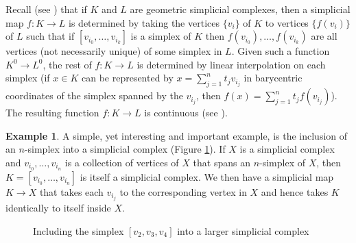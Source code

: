 \documentclass[12pt]{article}
\theoremstyle{plain}
\theoremstyle{definition}
\newtheorem{example}[theorem]{Example}
\begin{document}
Recall (see \cite[Section 2]{MK}) that if $K$ and $L$ are geometric simplicial complexes, then a simplicial map $f\colon K\to L$ is determined by taking the vertices $\{v_i\}$ of $K$ to vertices $\{f(v_i)\}$ of $L$ such that if $[v_{i_0},\ldots, v_{i_k}]$ is a simplex of $K$ then $f(v_{i_0}),\ldots, f(v_{i_k})$ are all vertices (not necessarily unique) of some simplex in $L$. Given such a function $K^0\to L^0$, the rest of $f\colon K\to L$ is determined by linear interpolation on each simplex (if $x\in K$ can be represented by $x=\sum_{j=1}^n t_jv_{i_j}$ in barycentric coordinates of the simplex spanned by the $v_{i_j}$, then $f(x)=\sum_{j=1}^n t_jf(v_{i_j})$).  The resulting function $f\colon K\to L$ is continuous (see \cite{MK}). 

\begin{example}
A simple, yet interesting and important example, is the inclusion of an $n$-simplex into a simplicial complex (Figure \ref{F: fig5-0}). If $X$ is a simplicial complex and ${v_{i_0},\ldots, v_{i_n}}$ is a collection of vertices of $X$ that spans an $n$-simplex of $X$, then $K=[v_{i_0},\ldots, v_{i_n}]$ is itself a simplicial complex. We then have a simplicial map $K\to X$ that takes each $v_{i_j}$ to the corresponding vertex in $X$ and hence takes $K$ identically to itself inside $X$. 


\begin{figure}[!htp]
\begin{center}
\end{center}
\caption{Including the simplex $[v_2,v_3,v_4]$ into a larger simplicial complex}\label{F: fig5-0}
\end{figure}
\end{example}
\end{document}

